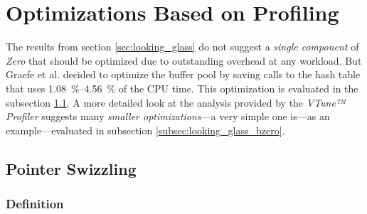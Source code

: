 \section{Optimizations Based on Profiling} \label{sec:looking_glass_optimizations}

    The results from section \ref{sec:looking_glass} do not suggest a \emph{single component} of \textit{Zero} that should be optimized due to outstanding overhead at any workload. But Graefe et al. decided to optimize the buffer pool by saving calls to the hash table that uses \SIrange{1.08}{4.56}{\percent} of the CPU time. This optimization is evaluated in the subsection \ref{subsec:looking_glass_swizzling}. A more detailed look at the analysis provided by the \textit{VTune™ Profiler} suggests many \emph{smaller optimizations}---a very simple one is---as an example---evaluated in subsection \ref{subsec:looking_glass_bzero}.

\subsection{Pointer Swizzling} \label{subsec:looking_glass_swizzling}

\subsubsection{Definition}

